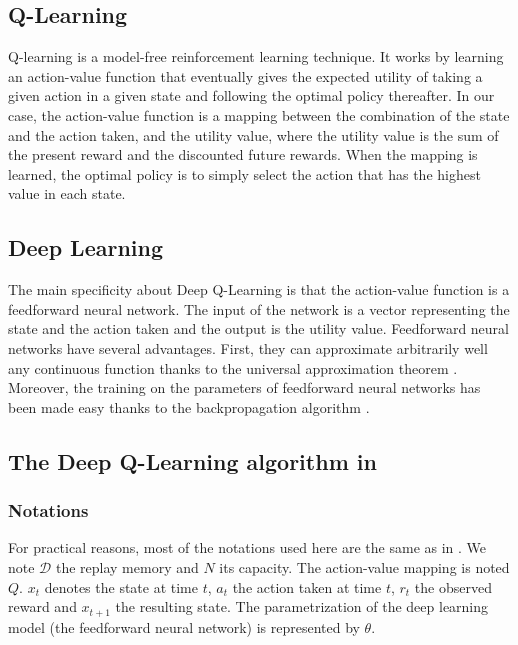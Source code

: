 \documentclass{article} %
\begin{document}
\subsection{Q-Learning}

Q-learning is a model-free reinforcement learning technique. It works by learning an action-value function that eventually gives the expected utility of taking a given action in a given state and following the optimal policy thereafter. In our case, the action-value function is a mapping between the combination of the state and the action taken, and the utility value, where the utility value is the sum of the present reward and the discounted future rewards. When the mapping is learned, the optimal policy is to simply select the action that has the highest value in each state. 

\subsection{Deep Learning}

The main specificity about Deep Q-Learning is that the action-value function is a feedforward neural network. The input of the network is a vector representing the state and the action taken and the output is the utility value. Feedforward neural networks have several advantages. First, they can approximate arbitrarily well any continuous function thanks to the universal approximation theorem \cite{universal}. Moreover, the training on the parameters of feedforward neural networks has been made easy thanks to the backpropagation algorithm \cite{backprop}.

\subsection{The Deep Q-Learning algorithm in \cite{deepmind}}


\subsubsection{Notations}
For practical reasons, most of the notations used here are the same as in \cite{deepmind}. We note $\mathcal{D}$ the replay memory and $N$ its capacity. The action-value mapping is noted $Q$. $x_t$ denotes the state at time $t$, $a_t$ the action taken at time $t$, $r_t$ the observed reward and $x_{t+1}$ the resulting state. The parametrization of the deep learning model (the feedforward neural network) is represented by $\theta$.
\end{document}
